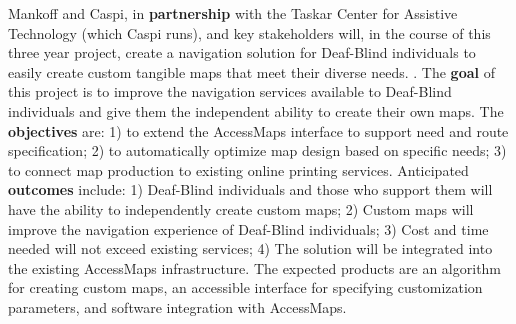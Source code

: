 Mankoff and Caspi, in \textbf{partnership} with the Taskar Center for Assistive Technology  (which Caspi runs), and key stakeholders will, in the course of this three year project, create a navigation solution for Deaf-Blind individuals to easily create custom tangible maps that meet their diverse needs. .
The \textbf{goal} of this project is to improve the navigation services available to Deaf-Blind individuals and give them the independent ability to create their own maps.  The \textbf{objectives} are: 1) to extend the AccessMaps interface to support need and route specification; 2) to automatically optimize map design based on specific needs; 3) to connect map production to existing online printing services. Anticipated \textbf{outcomes} include: 1) Deaf-Blind individuals and those who support them will have the ability to independently create custom maps; 2) Custom maps will improve the navigation experience of Deaf-Blind individuals; 3) Cost and time needed will not exceed existing services; 4) The solution will be integrated into the existing AccessMaps infrastructure. The expected products are an algorithm for creating custom maps, an accessible interface for specifying customization parameters, and software integration with AccessMaps. 